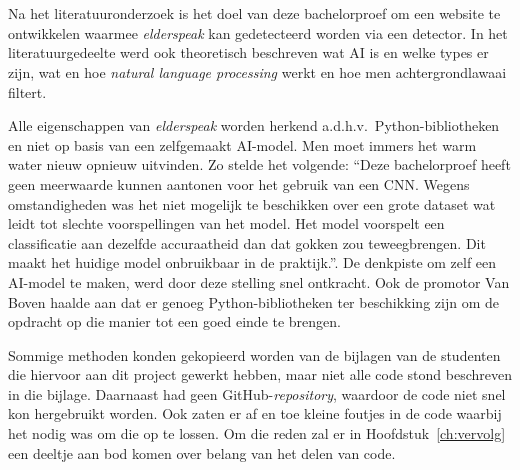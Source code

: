 
\chapter{}
\label{ch:methodologie}


Na het literatuuronderzoek is het doel van deze bachelorproef om een website te ontwikkelen waarmee \textit{elderspeak} kan gedetecteerd worden via een detector. In het literatuurgedeelte werd ook theoretisch beschreven wat AI is en welke types er zijn, wat en hoe \textit{natural language processing} werkt en hoe men achtergrondlawaai filtert.

Alle eigenschappen van \textit{elderspeak} worden herkend a.d.h.v.\ Python-bibliotheken en niet op basis van een zelfgemaakt AI-model. Men moet immers het warm water nieuw opnieuw uitvinden. Zo stelde \textcite{Beeckman2021} het volgende: ``Deze bachelorproef heeft geen meerwaarde kunnen aantonen voor het gebruik van een CNN. Wegens omstandigheden was het niet mogelijk te beschikken over een grote dataset wat leidt tot slechte voorspellingen van het model. Het model voorspelt een classificatie aan dezelfde accuraatheid dan dat gokken zou teweegbrengen. Dit maakt het huidige model onbruikbaar in de praktijk.''. De denkpiste om zelf een AI-model te maken, werd door deze stelling snel ontkracht. Ook de promotor Van Boven haalde aan dat er genoeg Python-bibliotheken ter beschikking zijn om de opdracht op die manier tot een goed einde te brengen.

Sommige methoden konden gekopieerd worden van de bijlagen van de studenten die hiervoor aan dit project gewerkt hebben, maar niet alle code stond beschreven in die bijlage. Daarnaast had \textcite{Standaert2021} geen GitHub-\textit{repository}, waardoor de code niet snel kon hergebruikt worden. Ook zaten er af en toe kleine foutjes in de code waarbij het nodig was om die op te lossen. Om die reden zal er in Hoofdstuk~\ref{ch:vervolg} een deeltje aan bod komen over belang van het delen van code.

